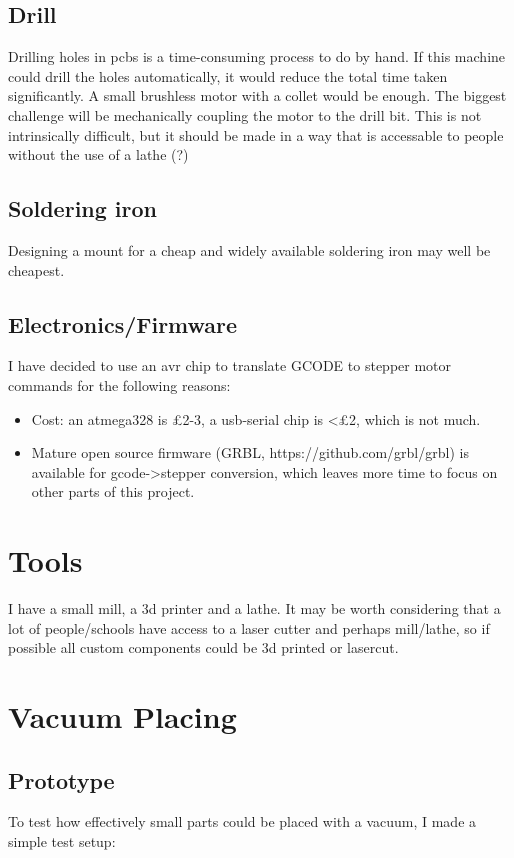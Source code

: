 \documentclass[a4paper,11pt]{article}  %
\begin{document}
\subsection{Drill}
Drilling holes in pcbs is a time-consuming process to do by hand. If this machine could drill the holes automatically,
it would reduce the total time taken significantly. A small brushless motor with a collet would be enough. The biggest challenge
will be mechanically coupling the motor to the drill bit. This is not intrinsically difficult, but it should be made in a way that
is accessable to people without the use of a lathe (?)

\subsection{Soldering iron}
Designing a mount for a cheap and widely available soldering iron may well be cheapest. 

\subsection{Electronics/Firmware}
I have decided to use an avr chip to translate GCODE to stepper motor commands for the following reasons:
\begin{itemize} \itemsep0em
	\item	Cost: an atmega328 is £2-3, a usb-serial chip is <£2, which is not much.
	\item	Mature open source firmware (GRBL, https://github.com/grbl/grbl) is available for gcode-\textgreater stepper
		conversion, which leaves more time to focus on other parts of this project.
\end{itemize}


\section{Tools}
I have a small mill, a 3d printer and a lathe. It may be worth considering that a lot of people/schools have
access to a laser cutter and perhaps mill/lathe, so if possible all custom components could be 3d printed or 
lasercut.

\section{Vacuum Placing}
\subsection{Prototype}
To test how effectively small parts could be placed with a vacuum, I made a simple test setup:
\end{document}
